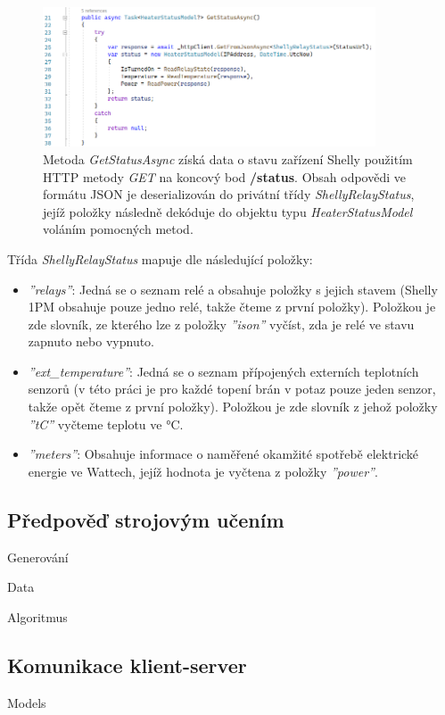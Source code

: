 \begin{figure}[hbt]
\includegraphics[width=0.88\textwidth]{obrazky-figures/code-shelly-status.png}
\caption{Metoda {\it GetStatusAsync} získá data o stavu zařízení Shelly použitím HTTP metody {\it GET} na koncový bod \textbf{/status}. Obsah odpovědi ve formátu JSON je deserializován do privátní třídy {\it ShellyRelayStatus}, jejíž položky následně dekóduje do objektu typu {\it HeaterStatusModel} voláním pomocných metod.}
\end{figure}

\noindent Třída {\it ShellyRelayStatus} mapuje dle \cite{shelly-api-status} následující položky:
\begin{itemize}
    \item {\it ''relays''}: Jedná se o seznam relé a obsahuje položky s jejich stavem (Shelly 1PM obsahuje pouze jedno relé, takže čteme z první položky). Položkou je zde slovník, ze kterého lze z položky {\it ''ison''} vyčíst, zda je relé ve stavu zapnuto nebo vypnuto.
    \item {\it ''ext\_temperature''}: Jedná se o seznam přípojených externích teplotních senzorů (v této práci je pro každé topení brán v potaz pouze jeden senzor, takže opět čteme z první položky). Položkou je zde slovník z jehož položky {\it ''tC''} vyčteme teplotu ve °C.
    \item {\it ''meters''}: Obsahuje informace o naměřené okamžité spotřebě elektrické energie ve Wattech, jejíž hodnota je vyčtena z položky {\it ''power''}.
\end{itemize}

\pagebreak

\subsection{Předpověď strojovým učením}
Generování

Data

Algoritmus


\subsection{Komunikace klient-server}
Models

